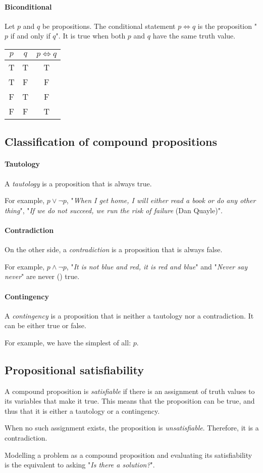 \documentclass[10pt,a4paper]{book}
\begin{document}
\paragraph*{Biconditional}
Let $p$ and $q$ be propositions. The conditional statement $p \Leftrightarrow q$ is the proposition "$p$ if and only if $q$". It is true when both $p$ and $q$ have the same truth value.\\
\begin{tabular}{ |c  c | c| }
\hline
 $p$ & $q$ & $p\Leftrightarrow q$\\
 \hline
 T & T & T \\ 
 T & F & F \\  
 F & T & F \\
 F & F & T \\
 \hline
\end{tabular}\par

\subsection{Classification of compound propositions}
\paragraph*{Tautology} A \textit{tautology} is a proposition that is always true.\par 
For example, $p\lor \neg p$, "\textit{When I get home, I will either read a book or do any other thing}", "\textit{If we do not succeed, we run the risk of failure} (Dan Quayle)".
\paragraph*{Contradiction} On the other side, a \textit{contradiction} is a proposition that is always false.\par 
For example, $p\land \neg p$, "\textit{It is not blue and red, it is red and blue}" and "\textit{Never say never}" are never (\smiley{}) true.
\paragraph*{Contingency} A \textit{contingency} is a proposition that is neither a tautology nor a contradiction. It can be either true or false.\par 
For example, we have the simplest of all: $p$.

\subsection{Propositional satisfiability}
A compound proposition is \textit{satisfiable} if there is an assignment of truth values to its variables that make it true. This means that the proposition can be true, and thus that it is either a tautology or a contingency.\par 
When no such assignment exists, the proposition is \textit{unsatisfiable}. Therefore, it is a contradiction.\par 
Modelling a problem as a compound proposition and evaluating its satisfiability is the equivalent to asking "\textit{Is there a solution?}".
\end{document}
